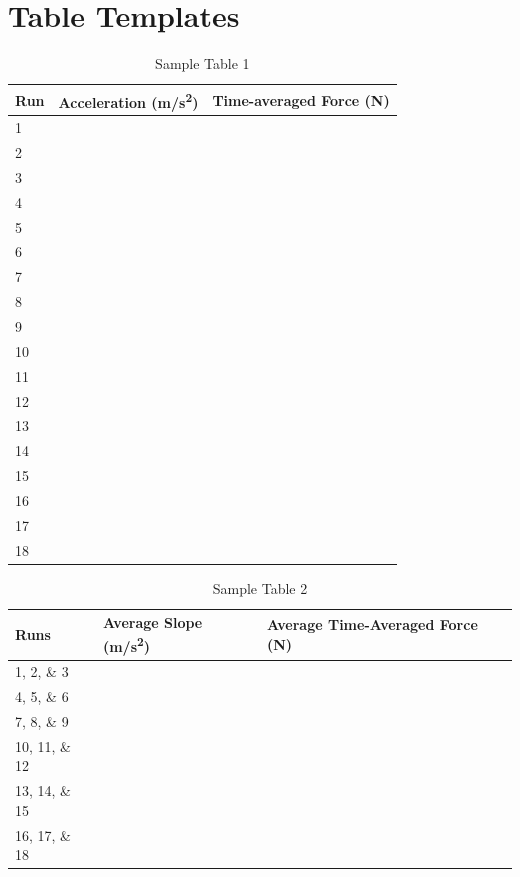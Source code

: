 \section{Table Templates}
%
\begin{table}[ht!]
    \begin{center}
        \begin{tabular}{l | l | l}
            \textbf{Run} & \textbf{Acceleration} (m/s\textsuperscript{2}) & \textbf{Time-averaged Force} (N) \\
            \hline
            1 & & \\
            2 & & \\
            3 & & \\
            \hline
            4 & & \\
            5 & & \\
            6 & & \\
            \hline
            7 & & \\
            8 & & \\
            9 & & \\
            \hline
            10 & & \\
            11 & & \\
            12 & & \\
            \hline
            13 & & \\
            14 & & \\
            15 & & \\
            \hline
            16 & & \\
            17 & & \\
            18 & & \\
            \hline
        \end{tabular}
    \end{center}
    \caption{Sample Table 1}
\end{table}
%
\begin{table}[ht!]
    \begin{center}
        \begin{tabular}{l | l | l}
            \textbf{Runs} & \textbf{Average Slope} (m/s\textsuperscript{2}) & \textbf{Average Time-Averaged Force} (N) \\
            \hline
            1, 2, \& 3 & & \\
            \hline
            4, 5, \& 6 & & \\
            \hline
            7, 8, \& 9 & & \\
            \hline
            10, 11, \& 12 & & \\
            \hline
            13, 14, \& 15 & & \\
            \hline
            16, 17, \& 18 & & \\
            \hline
        \end{tabular}
    \end{center}
    \caption{Sample Table 2}
\end{table}
